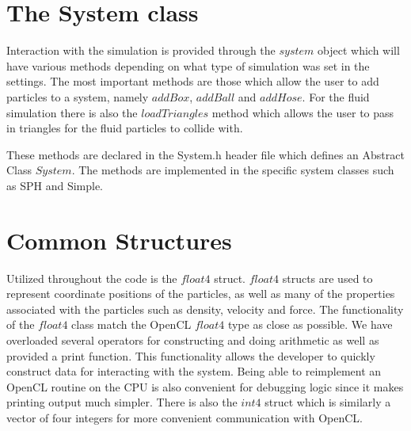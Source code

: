 \section{The System class}

Interaction with the simulation is provided through the $system$ object which
will have various methods depending on what type of simulation was set in the
settings. The most important methods are those which allow the user to add
particles to a system, namely $addBox$, $addBall$ and $addHose$. For the fluid
simulation there is also the $loadTriangles$ method which allows the user to
pass in triangles for the fluid particles to collide with.

These methods are declared in the System.h header file which defines an
Abstract Class $System$. The methods are implemented in the specific system
classes such as SPH and Simple.

\section{Common Structures}

Utilized throughout the code is the $float4$ struct. $float4$ structs are used
to represent coordinate positions of the particles, as well as many of the
properties associated with the particles such as density, velocity and force.
The functionality of the $float4$ class match the OpenCL $float4$ type as close
as possible. We have overloaded several operators for constructing and doing
arithmetic as well as provided a print function. This functionality allows the
developer to quickly construct data for interacting with the system. Being able
to reimplement an OpenCL routine on the CPU is also convenient for debugging
logic since it makes printing output much simpler. 
There is also the $int4$ struct which is similarly a vector of four integers
for more convenient communication with OpenCL.





